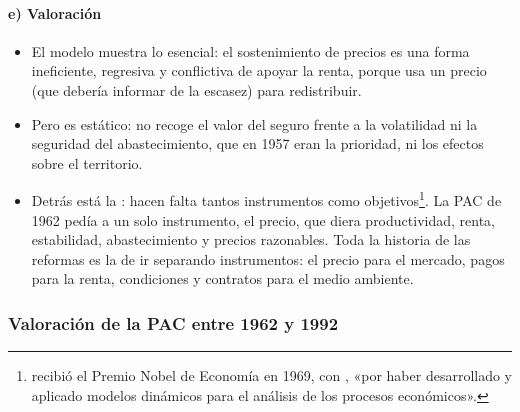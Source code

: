 \documentclass[11pt]{article}
\begin{document}
\paragraph{e) Valoración}

\begin{itemize}
\item El modelo muestra lo esencial: el sostenimiento de precios es una forma ineficiente, regresiva y conflictiva de apoyar la renta, porque usa un precio (que debería informar de la escasez) para redistribuir.
\item Pero es estático: no recoge el valor del seguro frente a la volatilidad ni la seguridad del abastecimiento, que en 1957 eran la prioridad, ni los efectos sobre el territorio.
\item Detrás está la : hacen falta tantos instrumentos como objetivos\footnote{ recibió el Premio Nobel de Economía en 1969, con , «por haber desarrollado y aplicado modelos dinámicos para el análisis de los procesos económicos»\nocite{Nobel1969}.}. La PAC de 1962 pedía a un solo instrumento, el precio, que diera productividad, renta, estabilidad, abastecimiento y precios razonables. Toda la historia de las reformas es la de ir separando instrumentos: el precio para el mercado, pagos para la renta, condiciones y contratos para el medio ambiente.
\end{itemize}

\subsubsection{Valoración de la PAC entre 1962 y 1992}\label{sec:valoracion-1962}
\end{document}
